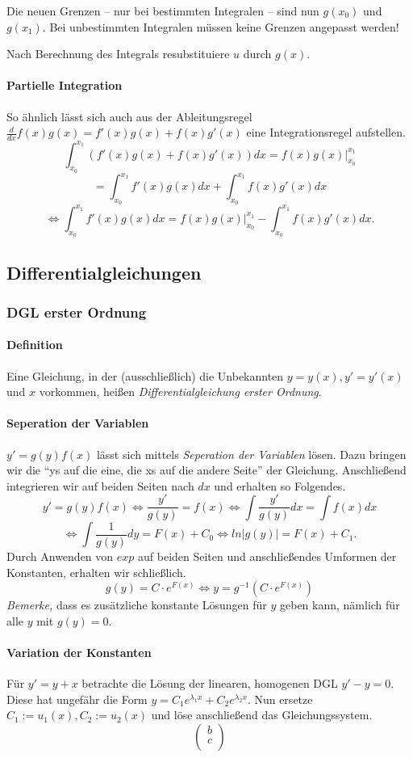\documentclass[a4paper, 9pt, DIV=24]{scrartcl}
\begin{document}
Die neuen Grenzen -- nur bei bestimmten Integralen -- sind nun $g(x_0)$ und $g(x_1)$.
Bei unbestimmten Integralen müssen keine Grenzen angepasst werden!

Nach Berechnung des Integrals resubstituiere $u$ durch $g(x)$.

\paragraph{Partielle Integration}
So ähnlich lässt sich auch aus der Ableitungsregel $\frac{d}{dx}f(x)g(x) = f'(x)g(x) + f(x)g'(x)$ eine Integrationsregel aufstellen.
\[ \int_{x_0}^{x_1}(f'(x)g(x)+f(x)g'(x))dx = f(x)g(x)|_{x_0}^{x_1} \]
\[ = \int_{x_0}^{x_1}f'(x)g(x)dx + \int_{x_0}^{x_1}f(x)g'(x)dx \]
\[ \iff \int_{x_0}^{x_1}f'(x)g(x)dx = f(x)g(x)|_{x_0}^{x_1} - \int_{x_0}^{x_1}f(x)g'(x)dx. \]

\subsection{Differentialgleichungen}

\subsubsection{DGL erster Ordnung}
\paragraph{Definition}
Eine Gleichung, in der (ausschließlich) die Unbekannten $y = y(x), y' = y'(x)$ und $x$ vorkommen, heißen \emph{Differentialgleichung erster Ordnung}.
\paragraph{Seperation der Variablen}
$y' = g(y)f(x)$ lässt sich mittels \emph{Seperation der Variablen} lösen.
Dazu bringen wir die ``ys auf die eine, die xs auf die andere Seite'' der Gleichung.
Anschließend integrieren wir auf beiden Seiten nach $dx$ und erhalten so Folgendes.
\[ y' = g(y)f(x) \iff \frac{y'}{g(y)} = f(x) \iff \int\frac{y'}{g(y)}dx = \int f(x)dx \]
\[ \iff \int\frac{1}{g(y)}dy = F(x) + C_0 \iff ln |g(y)| = F(x) + C_1. \]
Durch Anwenden von $exp$ auf beiden Seiten und anschließendes Umformen der Konstanten, erhalten wir schließlich.
\[ g(y) = C\cdot e^{F(x)} \iff y = g^{-1}(C\cdot e^{F(x)}) \]
\emph{Bemerke,} dass es zusätzliche konstante Lösungen für $y$ geben kann, nämlich für alle $y$ mit $g(y) = 0$.

\paragraph{Variation der Konstanten}
Für $y' = y + x$ betrachte die Lösung der linearen, homogenen DGL $y' - y = 0$. Diese hat ungefähr die Form $y = C_1 e^{\lambda_1 x} + C_2 e^{\lambda_2 x}$.
Nun ersetze $C_1 := u_1(x), C_2 := u_2(x)$ und löse anschließend das Gleichungssystem.
\[
\begin{pmatrix}
 b \\ c \\
\end{pmatrix}
\]
\end{document}
